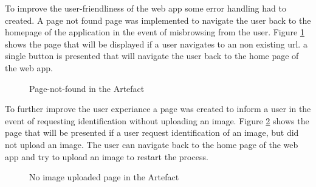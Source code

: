 To improve the user-friendliness of the web app some error handling had to created. A page not found page was implemented to navigate the user back to the homepage of the application in the event of misbrowsing from the user. Figure \ref{fig:404} shows the page that will be displayed if a user navigates to an non existing url. a single button is presented that will navigate the user back to the home page of the web app.

\begin{figure}[H]%
\centering
{}%
\caption{Page-not-found in the Artefact}%
\label{fig:404}%
\end{figure}

To further improve the user experiance a page was created to inform a user in the event of requesting identification without uploading an image. Figure \ref{fig:500} shows the page that will be presented if a user request identification of an image, but did not upload an image. The user can navigate back to the home page of the web app and try to upload an image to restart the process.

\begin{figure}[H]%
\centering
{}%
\caption{No image uploaded page in the Artefact}%
\label{fig:500}%
\end{figure}

